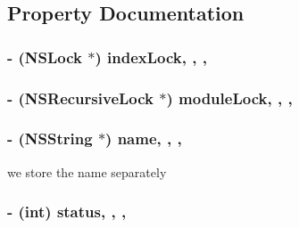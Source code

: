 \subsection{Property Documentation}
\hypertarget{interface_sword_module_a115e80b1eaefdb1701dfa8f108df190c}{
\subsubsection[{index\-Lock}]{\setlength{\rightskip}{0pt plus 5cm}-\/ (N\-S\-Lock $\ast$) index\-Lock\hspace{0.3cm}{\ttfamily [read]}, {\ttfamily [write]}, {\ttfamily [atomic]}, {\ttfamily [retain]}}}\label{interface_sword_module_a115e80b1eaefdb1701dfa8f108df190c}
\hypertarget{interface_sword_module_aa2dfd95c39168ffc06d703d959384b2c}{
\subsubsection[{module\-Lock}]{\setlength{\rightskip}{0pt plus 5cm}-\/ (N\-S\-Recursive\-Lock $\ast$) module\-Lock\hspace{0.3cm}{\ttfamily [read]}, {\ttfamily [write]}, {\ttfamily [atomic]}, {\ttfamily [retain]}}}\label{interface_sword_module_aa2dfd95c39168ffc06d703d959384b2c}
\hypertarget{interface_sword_module_afc8ccc6676addc3b49a494b2bf969c68}{
\subsubsection[{name}]{\setlength{\rightskip}{0pt plus 5cm}-\/ (N\-S\-String $\ast$) name\hspace{0.3cm}{\ttfamily [read]}, {\ttfamily [write]}, {\ttfamily [atomic]}, {\ttfamily [retain]}}}\label{interface_sword_module_afc8ccc6676addc3b49a494b2bf969c68}
we store the name separately \hypertarget{interface_sword_module_a6e27f49150e9a14580fb313cc2777e00}{
\subsubsection[{status}]{\setlength{\rightskip}{0pt plus 5cm}-\/ (int) status\hspace{0.3cm}{\ttfamily [read]}, {\ttfamily [write]}, {\ttfamily [atomic]}, {\ttfamily [assign]}}}\label{interface_sword_module_a6e27f49150e9a14580fb313cc2777e00}
